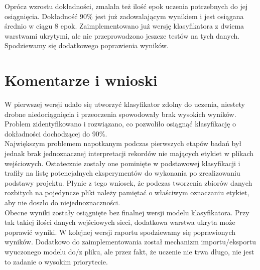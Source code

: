 \documentclass[a4paper,12pt]{article}
\begin{document}
\hspace{1cm}Oprócz wzrostu dokładności, zmalała też ilość epok uczenia potrzebnych do jej osiągnięcia. Dokładność 90\% jest już zadowalającym wynikiem i jest osiągana średnio w ciągu 8 epok. Zaimplementowano już wersję klasyfikatora z dwiema warstwami ukrytymi, ale nie przeprowadzono jeszcze testów na tych danych. Spodziewamy się dodatkowego poprawienia wyników.

\section{Komentarze i wnioski}
\hspace{1cm}W pierwszej wersji udało się utworzyć klasyfikator zdolny do uczenia, niestety drobne niedociągnięcia i przeoczenia spowodowały brak wysokich wyników. Problem zidentyfikowano i rozwiązano, co pozwoliło osiągnąć klasyfikację o dokładności dochodzącej do 90\%.\\
\hspace{1cm}Największym problemem napotkanym podczas pierwszych etapów badań był jednak brak jednoznacznej interpretacji rekordów nie mających etykiet w plikach wejściowych. Ostatecznie zostały one pominięte w podstawowej klasyfikacji i trafiły na listę potencjalnych eksperymentów do wykonania po zrealizowaniu podstawy projektu. Płynie z tego wniosek, że podczas tworzenia zbiorów danych rozbitych na pojedyncze pliki należy pamiętać o właściwym oznaczaniu etykiet, aby nie doszło do niejednoznaczności.\\
\hspace{1cm}Obecne wyniki zostały osiągnięte bez finalnej wersji modelu klasyfikatora. Przy tak takiej ilości danych wejściowych sieci, dodatkowa warstwa ukryta może poprawić wyniki. W kolejnej wersji raportu spodziewamy się poprawionych wyników. Dodatkowo do zaimplementowania został mechanizm importu/eksportu wyuczonego modelu do/z pliku, ale przez fakt, że uczenie nie trwa długo, nie jest to zadanie o wysokim priorytecie.
\end{document}
